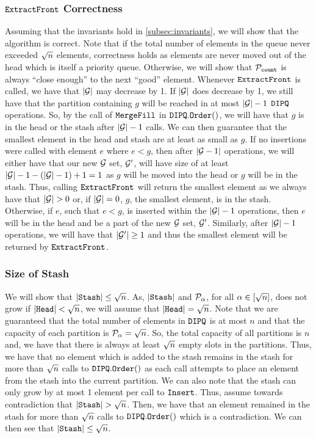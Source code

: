 \subsubsection*{$\texttt{ExtractFront}$ Correctness}
Assuming that the invariants hold in \cref{subsec:invariants}, we will show that the algorithm is correct.
Note that if the total number of elements in the queue never exceeded ${\sqrt{n}}$ elements, correctness holds as elements are never moved out of the head which is itself a priority queue.
Otherwise, we will show that $\mathcal{P}_{\texttt{count}}$ is always ``close enough'' to the next ``good'' element.
Whenever $\texttt{ExtractFront}$ is called, we have that $|\mathcal{G}|$ may decrease by 1. If $|\mathcal{G}|$ does decrease by 1,
we still have that the partition containing $g$ will be reached in at most $|\mathcal{G}| - 1$ $\texttt{DIPQ}$ operations.
So, by the call of $\texttt{MergeFill}$ in $\texttt{DIPQ}.\texttt{Order}()$, we will have that $g$ is in the head or the stash
after $|\mathcal{G}| - 1$ calls. 
We can then guarantee that the smallest element in the head and stash are at least as small as $g$.
If no insertions were called with element $e$ where $e < g$,
then after $|\mathcal{G} - 1|$ operations, we will either have that
our new $\mathcal{G}$ set, $\mathcal{G}'$, will have size of at least $|\mathcal{G}| - 1 - (|\mathcal{G}| - 1) + 1 = 1$
as $g$ will be moved into the head or $g$ will be in the stash. Thus, calling $\texttt{ExtractFront}$ will return the smallest element as we always have that $|\mathcal{G}| > 0$ or, if $|\mathcal{G}| = 0$, $g$, the smallest element, is in the stash.
Otherwise, if $e$, such that $e < g$, is inserted within the $|\mathcal{G}| - 1$ operations, then $e$ will be in the head and be a part of the new $\mathcal{G}$ set, $\mathcal{G}'$.
Similarly, after $|\mathcal{G}| - 1$ operations, we will have that $|\mathcal{G}'| \geq 1$ and thus the smallest element will be returned by $\texttt{ExtractFront}$.

\subsubsection*{Size of Stash}
We will show that $|\texttt{Stash}| \leq {\sqrt{n}}$. As, $|\texttt{Stash}|$ and $\mathcal{P}_\alpha$, for all $\alpha \in [{\sqrt{n}}]$, does not grow if $|\texttt{Head}| < {\sqrt{n}}$,
we will assume that $|\texttt{Head}| = {\sqrt{n}}$. 
Note that we are guaranteed that the total number of elements in $\texttt{DIPQ}$ is at most $n$ and that the capacity of each partition is $\mathcal{P}_\alpha = {\sqrt{n}}$.
So, the total capacity of all partitions is $n$ and, we have that there is always at least ${\sqrt{n}}$ empty slots in the partitions.
Thus, we have that no element which is added to the stash remains
in the stash for more than ${\sqrt{n}}$ calls to $\texttt{DIPQ}.\texttt{Order}()$ as each call attempts to place an element from the stash into the current partition.
We can also note that the stash can only grow by at most 1 element per call to $\texttt{Insert}$.
Thus, assume towards contradiction that $|\texttt{Stash}| > {\sqrt{n}}$. Then, we have that an element remained in the stash
for more than ${\sqrt{n}}$ calls to $\texttt{DIPQ}.\texttt{Order}()$ which is a contradiction.
We can then see that $|\texttt{Stash}| \leq {\sqrt{n}}$.

